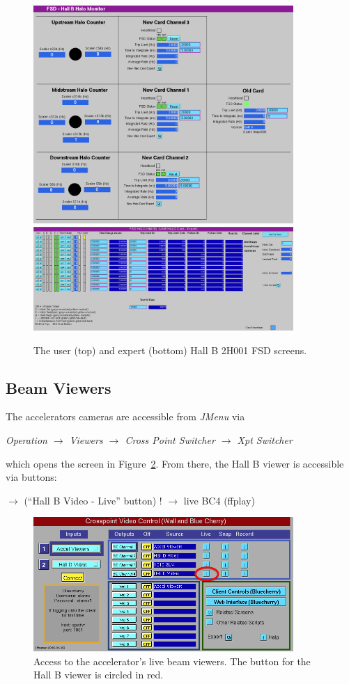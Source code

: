 \documentclass[amsmath,amssymb,notitlepage,11pt]{revtex4}
\begin{document}
\begin{figure}[htbp]\centering
  \includegraphics[width=0.88\textwidth]{pics/fsdexpert}\vspace{2mm}
    \includegraphics[width=0.88\textwidth]{pics/fsduser}
  \caption{The user (top) and expert (bottom) Hall B 2H001 FSD screens.\label{fig:fsd}}
\end{figure}
\subsection{Beam Viewers} The accelerators cameras are accessible from {\em JMenu} via  
\begin{center}{\em Operation $\to$ Viewers $\to$ Cross Point Switcher $\to$ Xpt Switcher}\end{center}
which opens the screen in Figure~\ref{fig:viewer}.  From there, the Hall B viewer is accessible via buttons:
\begin{center}$\to$ (``Hall B Video - Live'' button) ! $\to$ live BC4 (ffplay)\end{center}

\begin{figure}[htbp]\centering
  \includegraphics[width=0.88\textwidth]{pics/viewer}
  \caption{Access to the accelerator's live beam viewers.  The button for the Hall B viewer is circled in red.\label{fig:viewer}}
\end{figure}


%
\end{document}
